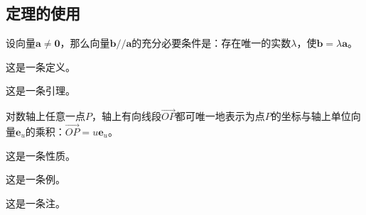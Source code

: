 \subsection{定理的使用}
\begin{theorem}
	设向量$\boldsymbol a\neq\boldsymbol 0$，那么向量$\boldsymbol b//\boldsymbol a$的充分必要条件是：存在唯一的实数$\lambda$，使$\boldsymbol b=\lambda \boldsymbol a$。
\end{theorem}
\begin{definition}
	这是一条定义。
\end{definition}
\begin{lemma}
	这是一条引理。
\end{lemma}
\begin{corollary}
	对数轴上任意一点$P$，轴上有向线段$\vec {OP}$都可唯一地表示为点$P$的坐标与轴上单位向量$\boldsymbol e_u$的乘积：$\vec {OP}=u \boldsymbol e_u$。
\end{corollary}
\begin{proposition}
	这是一条性质。
\end{proposition}
\begin{example}
	这是一条例。
\end{example}
\begin{remark}
	这是一条注。
\end{remark}